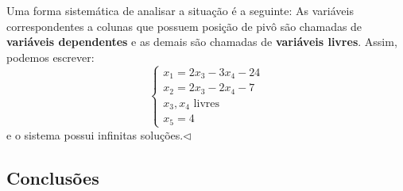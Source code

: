 \begin{ex}
Uma forma sistemática de analisar a situação é a seguinte: As variáveis correspondentes a colunas que possuem posição de pivô são chamadas de \textbf{variáveis dependentes} e as demais são chamadas de \textbf{variáveis livres}. Assim, podemos escrever:
\begin{equation}
\left\{
  \begin{array}{l}
       x_1  = 2 x_3 - 3 x_4 -24 \\
       x_2 = 2 x_3 - 2 x_4  -7  \\
       x_3, x_4 \text{ livres } \\
       x_5  = 4
  \end{array}
\right.
\end{equation} e o sistema possui infinitas soluções.$\lhd$
\end{ex}


\subsection{Conclusões}

